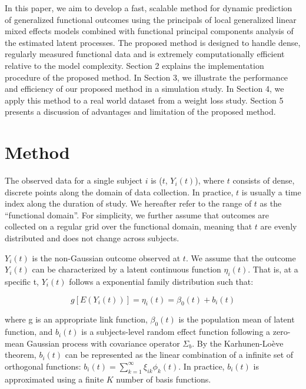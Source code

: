 \documentclass[
  11pt,
]{article}
\begin{document}
In this paper, we aim to develop a fast, scalable method for dynamic
prediction of generalized functional outcomes using the principals of
local generalized linear mixed effects models combined with functional
principal components analysis of the estimated latent processes. The
proposed method is designed to handle dense, regularly measured
functional data and is extremely computationally efficient relative to
the model complexity. Section 2 explains the implementation procedure of
the proposed method. In Section 3, we illustrate the performance and
efficiency of our proposed method in a simulation study. In Section 4,
we apply this method to a real world dataset from a weight loss study.
Section 5 presents a discussion of advantages and limitation of the
proposed method.

\hypertarget{method}{%
\section{Method}\label{method}}

The observed data for a single subject \(i\) is (\(t\), \(Y_i(t)\)),
where \(t\) consists of dense, discrete points along the domain of data
collection. In practice, \(t\) is usually a time index along the
duration of study. We hereafter refer to the range of \(t\) as the
``functional domain''. For simplicity, we further assume that outcomes
are collected on a regular grid over the functional domain, meaning that
\(t\) are evenly distributed and does not change across subjects.

\(Y_i(t)\) is the non-Gaussian outcome observed at \(t\). We assume that
the outcome \(Y_i(t)\) can be characterized by a latent continuous
function \(\eta_i(t)\). That is, at a specific t, \(Y_i(t)\) follows a
exponential family distribution such that:

\[
g[E(Y_i(t))] = \eta_i(t) = \beta_0(t)+b_i(t)
\]

where g is an appropriate link function, \(\beta_0(t)\) is the
population mean of latent function, and \(b_i(t)\) is a subjects-level
random effect function following a zero-mean Gaussian process with
covariance operator \(\Sigma_b\). By the Karhunen-Loève theorem,
\(b_i(t)\) can be represented as the linear combination of a infinite
set of orthogonal functions:
\(b_i(t)=\sum_{k=1}^{\infty}\xi_{ik}\phi_{k}(t)\). In practice,
\(b_i(t)\) is approximated using a finite \(K\) number of basis
functions.
\end{document}
